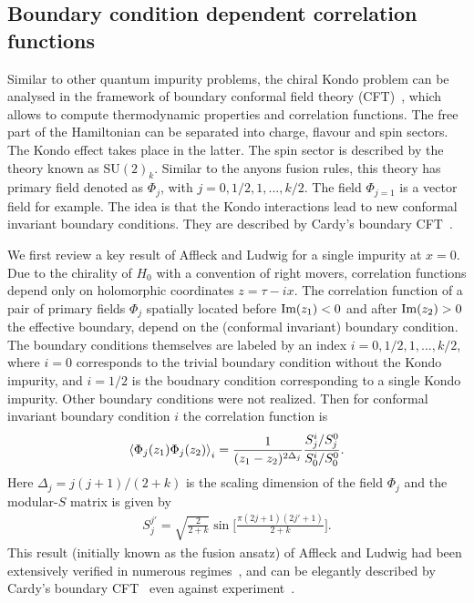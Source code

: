 \documentclass[aps,prb,twocolumn,superscriptaddress]{revtex4-1}
\begin{document}
\subsection{Boundary condition dependent correlation functions}
Similar to other quantum impurity problems, the chiral Kondo problem can be analysed in the framework of boundary conformal field theory (CFT)~\cite{affleck1993exact,ludwig1994exact}, which allows to compute thermodynamic properties and correlation functions. The free part of the Hamiltonian can be separated into charge, flavour and spin sectors. The Kondo effect takes place in the latter. The spin sector is described by the theory known as SU$(2)_{k}$. Similar to the anyons fusion rules, this theory has primary field denoted as $\Phi_{j}$, with $j=0,1/2,1,...,k/2$. The field $\Phi_{j=1}$ is a vector field for example. The idea is that the Kondo interactions lead to new conformal invariant boundary conditions. They are described by Cardy's boundary CFT~\cite{CARDY_1,CARDY_2,Cardy_Lewellen,Cardy_review}. 

We first review a key result of Affleck and Ludwig for a single impurity at $x=0$.~\cite{ludwig1994exact} Due to the chirality of $H_0$ with a convention of right movers, correlation functions depend only on holomorphic coordinates $z=\tau-ix$. The correlation function of a pair of primary fields $\Phi_j$ spatially located before $\textup{Im}(z_{1})<0$ and after $\textup{Im}(z_{2})>0$ the effective boundary, depend on the (conformal invariant) boundary condition. The boundary conditions themselves are labeled by an index  $i=0,1/2,1,...,k/2$, where $i=0$ corresponds to the trivial boundary condition without the Kondo impurity, and $i=1/2$ is the boudnary condition corresponding to a single Kondo impurity. Other boundary conditions were not realized. Then for conformal invariant boundary condition $i$ the correlation function is~\cite{Cardy_Lewellen} 
\begin{eqnarray}
\braket{\Phi_{j}(z_{1})\Phi_{j}(z_{2})}_{i}=\frac{1}{(z_{1}-z_{2})^{2\Delta_{j}}}\frac{S_{j}^{i}/S_{j}^{0}}{S_{0}^{i}/S_{0}^{0}}. \label{eqn:BCFT}
\end{eqnarray}
Here  $\Delta_{j}=j(j+1)/(2+k)$ is the scaling dimension of the field $\Phi_j$ and the modular-$S$ matrix  is given by~\cite{affleck1993exact} 
\begin{eqnarray}
S_{j}^{j'}=\sqrt{\frac{2}{2+k}}\sin\Biggl[\frac{\pi(2j+1)(2j'+1)}{2+k}\Biggr]. \label{eqn:Smod}
\end{eqnarray}
This result (initially known as the fusion ansatz) of Affleck and Ludwig had been extensively verified in numerous regimes~\cite{affleck1992relevance,pustilnik2004quantum,sela2011exact,mitchell2012universal}, and can be elegantly described by Cardy's boundary CFT~\cite{CARDY_1,CARDY_2,Cardy_Lewellen,Cardy_review} even against experiment~\cite{potok2007observation,keller2015universal}. 
\end{document}
